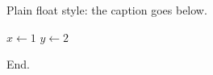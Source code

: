 \documentclass{article}
\begin{document}
Plain float style: the caption goes below.

\begin{algorithm}[h]
\begin{algorithmic}[1]
\STATE $x \gets 1$
\STATE $y \gets 2$
\end{algorithmic}
\caption{Plain style}
\end{algorithm}

End.
\end{document}
